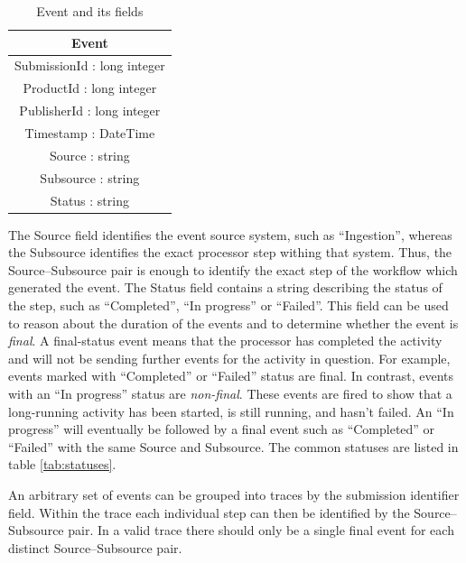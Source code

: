 \begin{table}[htb]
\begin{center}
\begin{tabular}{| c |}
\hline
\textbf{Event} \\
\hline
SubmissionId : long integer\\
ProductId : long integer\\
PublisherId : long integer\\
Timestamp : DateTime\\
Source : string\\
Subsource : string\\
Status : string\\
\hline
\end{tabular}
\end{center}
\caption{Event and its fields}
\label{tab:event}
\end{table}

The Source field identifies the event source system, such as ``Ingestion'', whereas the Subsource identifies the exact processor step withing that system. 
Thus, the Source--Subsource pair is enough to identify the exact step of the workflow which generated the event. 
The Status field contains a string describing the status of the step, such as ``Completed'', ``In progress'' or ``Failed''. 
This field can be used to reason about the duration of the events and to determine whether the event is \emph{final}. 
A final-status event means that the processor has completed the activity and will not be sending further events for the activity in question.
For example, events marked with ``Completed'' or ``Failed'' status are final.
In contrast, events with an ``In progress'' status are \emph{non-final}.
These events are fired to show that a long-running activity has been started, is still running, and hasn't failed.
An ``In progress'' will eventually be followed by a final event such as ``Completed'' or ``Failed'' with the same Source and Subsource.
The common statuses are listed in table \ref{tab:statuses}.

An arbitrary set of events can be grouped into traces by the submission identifier field. 
Within the trace each individual step can then be identified by the Source--Subsource pair.
In a valid trace there should only be a single final event for each distinct Source--Subsource pair.

